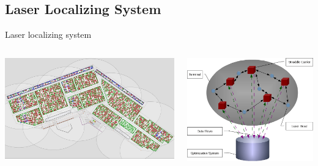 \documentclass{beamer}
\begin{document}
\subsection*{Laser Localizing System}
\begin{frame}{Laser localizing system}
  \begin{columns}
   
    \begin{column}[l]{6cm}
	  \begin{center}
	  \includegraphics[height=.50\textheight]{fig/captureBornesLaser.png}
	  \end{center}
    \end{column}
    \begin{column}[r]{4.5cm}	
      \begin{flushright}
	\includegraphics[height=.50\textheight]{fig/communicationsEN.png}
      \end{flushright}
    \end{column}
 \end{columns}	
  \begin{columns}
   

\end{columns}
\end{frame}
\end{document}
